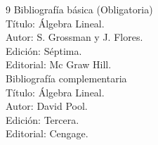 \begin{thebibliography}{9}
 Bibliograf\'ia b\'asica (Obligatoria)\\
Título: Álgebra Lineal.\\
Autor: S. Grossman y J. Flores.\\
Edición: Séptima.\\
Editorial: Mc Graw Hill.\\


Bibliograf\'ia complementaria\\
Título: Álgebra Lineal.\\
Autor: David Pool.\\
Edición: Tercera. \\
Editorial: Cengage.\\
\end{thebibliography} 